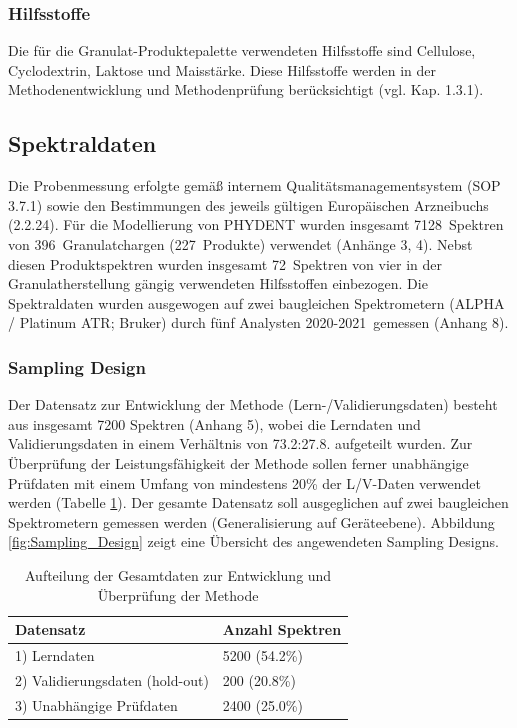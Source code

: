 \documentclass[11pt, a4paper]{article}
\newcommand\AnzahlProdukte{227}
\newcommand\NoSpectraRefLearn{5200 (54.2\%)}
\newcommand\NoSpectraRefVal{200 (20.8\%)}
\newcommand\NoSpectraPruef{2400 (25.0\%)}
\newcommand\NrSpektren{7128}
\newcommand\Granulatchargen{396}
\newcommand\NrMatrix{72}
\newcommand\DateRange{2020-2021}
\begin{document}
\subsubsection{Hilfsstoffe}
\label{sec:Hilfsstoffe}
Die für die Granulat-Produktepalette verwendeten Hilfsstoffe sind Cellulose, Cyclodextrin, Laktose und Maisstärke. Diese Hilfsstoffe werden in der Methodenentwicklung und Methodenprüfung berücksichtigt (vgl. Kap. 1.3.1).

\subsection{Spektraldaten}
Die Probenmessung erfolgte gemäß internem Qualitätsmanagementsystem (SOP 3.7.1) sowie den Bestimmungen des jeweils gültigen Europäischen Arzneibuchs (2.2.24). Für die Modellierung von PHYDENT wurden insgesamt \NrSpektren\ Spektren von \Granulatchargen\ Granulatchargen (\AnzahlProdukte\ Produkte) verwendet (Anhänge 3, 4). Nebst diesen Produktspektren wurden insgesamt \NrMatrix\ Spektren von vier in der Granulatherstellung gängig verwendeten Hilfsstoffen einbezogen. Die Spektraldaten wurden ausgewogen auf zwei baugleichen Spektrometern (ALPHA / Platinum ATR; Bruker) durch fünf Analysten \DateRange\ gemessen (Anhang 8).

\subsubsection{Sampling Design}
Der Datensatz zur Entwicklung der Methode (Lern-/Validierungsdaten) besteht aus insgesamt 7200 Spektren (Anhang 5), wobei die Lerndaten und Validierungsdaten in einem Verhältnis von 73.2:27.8. aufgeteilt wurden. Zur Überprüfung der Leistungsfähigkeit der Methode sollen ferner unabhängige Prüfdaten mit einem Umfang von mindestens 20\% der L/V-Daten verwendet werden (Tabelle \ref{tab:Aufteilung_gesamtdaten}). Der gesamte Datensatz soll ausgeglichen auf zwei baugleichen Spektrometern gemessen werden (Generalisierung auf Geräteebene). Abbildung \ref{fig:Sampling_Design} zeigt eine Übersicht des angewendeten Sampling Designs.

\begin{table}
\begin{center}
\begin{tabular}{| m{7cm} | m{7cm}| }
\hline
Datensatz & Anzahl Spektren \\
\hline
1) Lerndaten & \NoSpectraRefLearn \\
\hline
2) Validierungsdaten (hold-out) & \NoSpectraRefVal \\
\hline
3) Unabhängige Prüfdaten & \NoSpectraPruef \\
\hline
\end{tabular}
\end{center}
\caption{Aufteilung der Gesamtdaten zur Entwicklung und Überprüfung der Methode}
\label{tab:Aufteilung_gesamtdaten}
\end{table}
\end{document}
